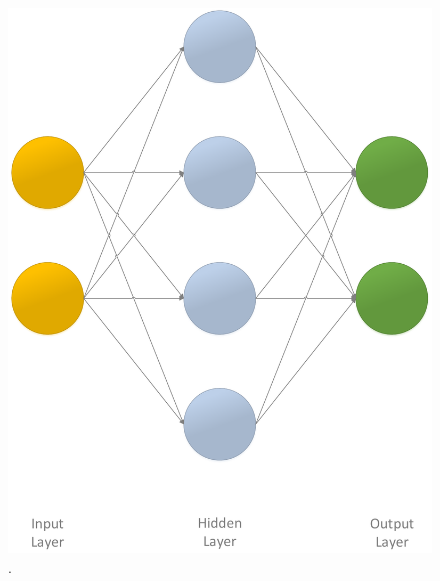 \begin{figure}[!ht]
	\centering
	\begin{minipage}[b]{0.45\textwidth}
		\includegraphics[width=\textwidth]{img/ann_1h}
		\caption{.}
		\label{fig:ann_1h}
	\end{minipage}
	\hfill
	\begin{minipage}[b]{0.45\textwidth}

\end{minipage}
\end{figure}
